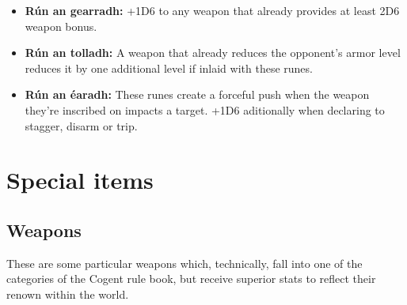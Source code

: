 \documentclass[parskip=full,11pt,%
footheight=38pt]{scrreport}
\begin{document}
\begin{itemize}
	\item \textbf{Rún an gearradh:} +1D6 to any weapon that already provides at least 2D6 weapon bonus.
	\item \textbf{Rún an tolladh:} A weapon that already reduces the opponent's armor level reduces it
		  by one additional level if inlaid with these runes.
	\item \textbf{Rún an éaradh:} These runes create a forceful push when the weapon they're inscribed
		  on impacts a target. +1D6 aditionally when declaring to stagger, disarm or trip.
\end{itemize}

\chapter{Special items}
\section{Weapons}
These are some particular weapons which, technically, fall into one of the categories of the Cogent rule book,
but receive superior stats to reflect their renown within the world.

\end{document}
